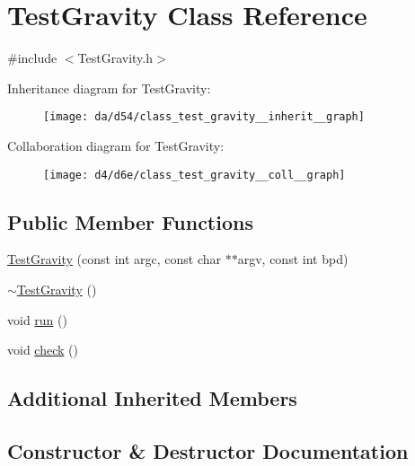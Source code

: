 \hypertarget{class_test_gravity}{}\section{Test\+Gravity Class Reference}
\label{class_test_gravity}


{\ttfamily \#include $<$Test\+Gravity.\+h$>$}



Inheritance diagram for Test\+Gravity\+:\nopagebreak
\begin{figure}[H]
\begin{center}
\leavevmode
\texttt{[image: da/d54/class\_test\_gravity\_\_inherit\_\_graph]}
\end{center}
\end{figure}


Collaboration diagram for Test\+Gravity\+:\nopagebreak
\begin{figure}[H]
\begin{center}
\leavevmode
\texttt{[image: d4/d6e/class\_test\_gravity\_\_coll\_\_graph]}
\end{center}
\end{figure}
\subsection*{Public Member Functions}
\begin{DoxyCompactItemize}
\item 
\hyperlink{class_test_gravity_a00cbceb3d84a9f6497c62201cd81de64}{Test\+Gravity} (const int argc, const char $\ast$$\ast$argv, const int bpd)
\item 
\hyperlink{class_test_gravity_a14d894be30f2cc66ba7d29a1bb4b341c}{$\sim$\+Test\+Gravity} ()
\item 
void \hyperlink{class_test_gravity_aa34d45935f342a44e09cf721acbc299e}{run} ()
\item 
void \hyperlink{class_test_gravity_ad4f6213ca2e546f05284d991f7314ae7}{check} ()
\end{DoxyCompactItemize}
\subsection*{Additional Inherited Members}


\subsection{Constructor \& Destructor Documentation}
\hypertarget{class_test_gravity_a00cbceb3d84a9f6497c62201cd81de64}{}
